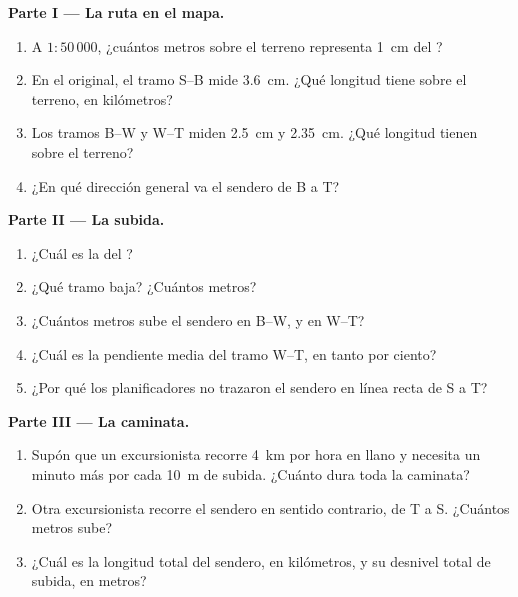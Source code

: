 \begin{problem}
\noindent\textbf{Parte I --- La ruta en el mapa.}\par\nopagebreak
\begin{enumerate}[beginpenalty=10000]
  \item A $1 : 50\,000$, ¿cuántos metros sobre el terreno representa
        \qty{1}{cm} del ?
  \item En el  original, el tramo S--B mide \qty{3.6}{cm}. ¿Qué
        longitud tiene sobre el terreno, en kilómetros?
  \item Los tramos B--W y W--T miden \qty{2.5}{cm} y \qty{2.35}{cm}. ¿Qué
        longitud tienen sobre el terreno?
  \item ¿En qué dirección general va el sendero de B a T?
\end{enumerate}

\noindent\textbf{Parte II --- La subida.}\par\nopagebreak
\begin{enumerate}[resume, beginpenalty=10000]
  \item ¿Cuál es la  del ?
  \item ¿Qué tramo baja? ¿Cuántos metros?
  \item ¿Cuántos metros sube el sendero en B--W, y en W--T?
  \item ¿Cuál es la pendiente media del tramo W--T, en tanto por ciento?
  \item ¿Por qué los planificadores no trazaron el sendero en línea recta
        de S a T?
\end{enumerate}

\noindent\textbf{Parte III --- La caminata.}\par\nopagebreak
\begin{enumerate}[resume, beginpenalty=10000]
  \item Supón que un excursionista recorre \qty{4}{km} por hora en llano y
        necesita un minuto más por cada \qty{10}{m} de subida. ¿Cuánto
        dura toda la caminata?
  \item Otra excursionista recorre el sendero en sentido contrario, de T a
        S. ¿Cuántos metros sube?
  \item ¿Cuál es la longitud total del sendero, en kilómetros, y su
        desnivel total de subida, en metros?
\end{enumerate}
\end{problem}
